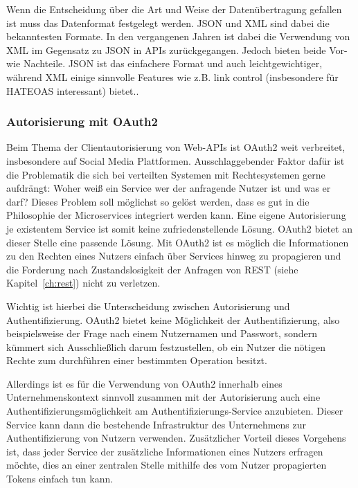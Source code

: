 \documentclass[12pt,a4paper,bibliography=totocnumbered,listof=totocnumbered]{scrartcl}
\begin{document}
Wenn die Entscheidung über die Art und Weise der Datenübertragung gefallen ist muss das Datenformat festgelegt werden. JSON und XML sind dabei die bekanntesten Formate. In den vergangenen Jahren ist dabei die Verwendung von XML im Gegensatz zu JSON in \acp{API} zurückgegangen\cite{duvander2}. Jedoch bieten beide Vor- wie Nachteile. JSON ist das einfachere Format und auch leichtgewichtiger, während XML einige sinnvolle Features wie z.B. link control (insbesondere für \ac{HATEOAS} interessant) bietet.\cite[S.101]{buildingms}.

\subsubsection{Autorisierung mit OAuth2}

Beim Thema der Clientautorisierung von Web-\acp{API} ist OAuth2 weit verbreitet, insbesondere auf Social Media Plattformen. Ausschlaggebender Faktor dafür ist die Problematik die sich bei verteilten Systemen mit Rechtesystemen gerne aufdrängt: Woher weiß ein Service wer der anfragende Nutzer ist und was er darf? Dieses Problem soll möglichst so gelöst werden, dass es gut in die Philosophie der Microservices integriert werden kann. Eine eigene Autorisierung je existentem Service ist somit keine zufriedenstellende Lösung. OAuth2 bietet an dieser Stelle eine passende Lösung. Mit OAuth2 ist es möglich die Informationen zu den Rechten eines Nutzers einfach über Services hinweg zu propagieren und die Forderung nach Zustandslosigkeit der Anfragen von REST (siehe Kapitel~\ref{ch:rest}) nicht zu verletzen.

Wichtig ist hierbei die Unterscheidung zwischen Autorisierung und Authentifizierung. OAuth2 bietet keine Möglichkeit der Authentifizierung, also beispielsweise der Frage nach einem Nutzernamen und Passwort, sondern kümmert sich Ausschließlich darum festzustellen, ob ein Nutzer die nötigen Rechte zum durchführen einer bestimmten Operation besitzt.\cite{degges}

\begin{sloppypar}
Allerdings ist es für die Verwendung von OAuth2 innerhalb eines Unternehmenskontext sinnvoll zusammen mit der Autorisierung auch eine Authentifizierungsmöglichkeit am Authentifizierungs-Service anzubieten. Dieser Service kann dann die bestehende Infrastruktur des Unternehmens zur Authentifizierung von Nutzern verwenden. Zusätzlicher Vorteil dieses Vorgehens ist, dass jeder Service der zusätzliche Informationen eines Nutzers erfragen möchte, dies an einer zentralen Stelle mithilfe des vom Nutzer propagierten Tokens einfach tun kann.
\end{sloppypar}
\end{document}

